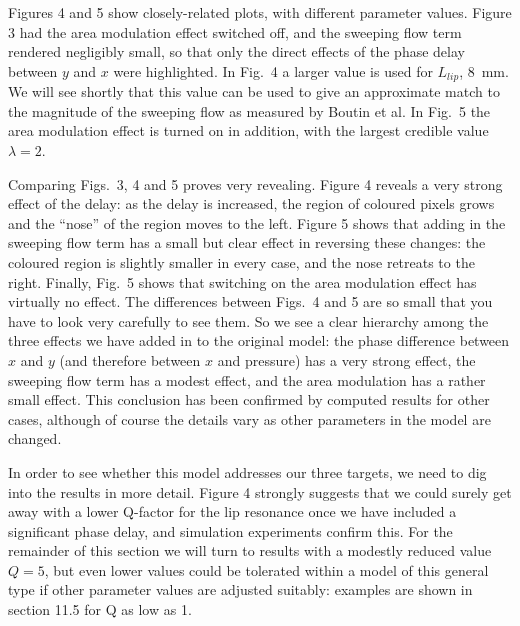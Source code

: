   Figures 4 and 5 show closely-related plots, with different parameter values. 
  Figure 3 had the area modulation effect switched off, and the sweeping flow 
  term rendered negligibly small, so that only the direct effects of the phase 
  delay between $y$ and $x$ were highlighted. In Fig.\ 4 a larger value is used 
  for $L_{lip}$, 8~mm. We will see shortly that this value can be used to give 
  an approximate match to the magnitude of the sweeping flow as measured by 
  Boutin et al. In Fig.\ 5 the area modulation effect is turned on in addition, 
  with the largest credible value $\lambda =2$. 



  Comparing Figs.\ 3, 4 and 5 proves very revealing. Figure 4 reveals a very 
  strong effect of the delay: as the delay is increased, the region of coloured 
  pixels grows and the ``nose'' of the region moves to the left. Figure 5 shows 
  that adding in the sweeping flow term has a small but clear effect in 
  reversing these changes: the coloured region is slightly smaller in every 
  case, and the nose retreats to the right. Finally, Fig.\ 5 shows that 
  switching on the area modulation effect has virtually no effect. The 
  differences between Figs.\ 4 and 5 are so small that you have to look very 
  carefully to see them. So we see a clear hierarchy among the three effects we 
  have added in to the original model: the phase difference between $x$ and $y$ 
  (and therefore between $x$ and pressure) has a very strong effect, the 
  sweeping flow term has a modest effect, and the area modulation has a rather 
  small effect. This conclusion has been confirmed by computed results for 
  other cases, although of course the details vary as other parameters in the 
  model are changed. 

  In order to see whether this model addresses our three targets, we need to 
  dig into the results in more detail. Figure 4 strongly suggests that we could 
  surely get away with a lower Q-factor for the lip resonance once we have 
  included a significant phase delay, and simulation experiments confirm this. 
  For the remainder of this section we will turn to results with a modestly 
  reduced value $Q=5$, but even lower values could be tolerated within a model 
  of this general type if other parameter values are adjusted suitably: 
  examples are shown in section 11.5 for Q as low as 1. 

